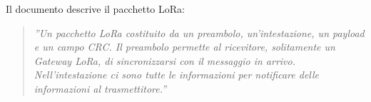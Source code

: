 \documentclass[a4paper]{report} %
\begin{document}
Il documento \cite{art:rif.48} descrive il pacchetto LoRa:
\begin{quote}
	\textit{''Un pacchetto LoRa costituito da un preambolo, un'intestazione, un payload e un campo CRC. Il preambolo permette al ricevitore, solitamente un Gateway LoRa, di sincronizzarsi con il messaggio in arrivo. Nell'intestazione ci sono tutte le informazioni per notificare delle informazioni al trasmettitore.''}
\end{quote}


\end{document}
